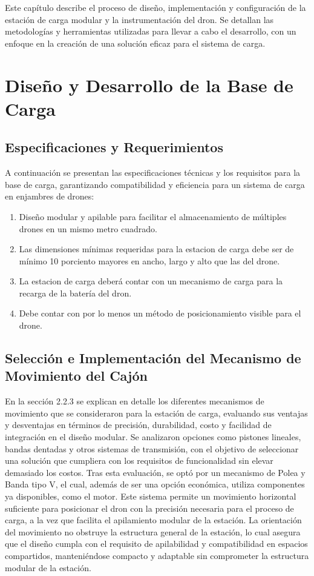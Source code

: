 
Este capítulo describe el proceso de diseño, implementación y configuración de la estación de carga modular y la instrumentación del dron. Se detallan las metodologías y herramientas utilizadas para llevar a cabo el desarrollo, con un enfoque en la creación de una solución eficaz para el sistema de carga.

\section{Diseño y Desarrollo de la Base de Carga}
\subsection{Especificaciones y Requerimientos}
A continuación se presentan las especificaciones técnicas y los requisitos para la base de carga, garantizando compatibilidad y eficiencia para un sistema de carga en enjambres de drones:
    \begin{enumerate}
        \item Diseño modular y apilable para facilitar el almacenamiento de múltiples drones en un mismo metro cuadrado.
        \item Las dimensiones mínimas requeridas para la estacion de carga debe ser de mínimo 10 porciento mayores en ancho, largo y alto que las del drone.
        \item La estacion de carga deberá contar con un mecanismo de carga para la recarga de la batería del dron.
        \item Debe contar con por lo menos un método de posicionamiento visible para el drone.
    \end{enumerate}

\subsection{Selección e Implementación del Mecanismo de Movimiento del Cajón}

En la sección 2.2.3 se explican en detalle los diferentes mecanismos de movimiento que se consideraron para la estación de carga, evaluando sus ventajas y desventajas en términos de precisión, durabilidad, costo y facilidad de integración en el diseño modular. Se analizaron opciones como pistones lineales, bandas dentadas y otros sistemas de transmisión, con el objetivo de seleccionar una solución que cumpliera con los requisitos de funcionalidad sin elevar demasiado los costos. 
Tras esta evaluación, se optó por un mecanismo de Polea y Banda tipo V, el cual, además de ser una opción económica, utiliza componentes ya disponibles, como el motor. Este sistema permite un movimiento horizontal suficiente para posicionar el dron con la precisión necesaria para el proceso de carga, a la vez que facilita el apilamiento modular de la estación. La orientación del movimiento no obstruye la estructura general de la estación, lo cual asegura que el diseño cumpla con el requisito de apilabilidad y compatibilidad en espacios compartidos, manteniéndose compacto y adaptable sin comprometer la estructura modular de la estación.

